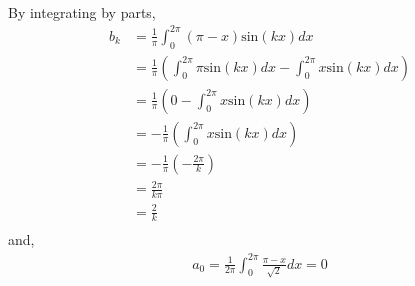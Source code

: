 \documentclass[letterpaper,12pt]{article}
\theoremstyle{definition}
\begin{document}
\\
By integrating by parts,
\begin{align*}
b_k &= \frac{1}{\pi} \int^{2\pi}_{0} (\pi - x) \text{sin}(kx) dx\\
&= \frac{1}{\pi} \left(  \int^{2\pi}_{0} \pi \text{sin}(kx) dx - \int^{2\pi}_{0} x \text{sin}(kx) dx\right)\\
&= \frac{1}{\pi} \left(  0 - \int^{2\pi}_{0} x \text{sin}(kx) dx\right)\\
&= -\frac{1}{\pi} \left(  \int^{2\pi}_{0} x \text{sin}(kx) dx\right)\\
&= - \frac{1}{\pi} \left(  -\frac{2\pi}{k}\right)\\
&=  \frac{2\pi}{k\pi} \\
&=  \frac{2}{k} \\
\end{align*}
and,
\begin{align*}
a_0 = \frac{1}{2\pi} \int^{2  \pi}_{0} \frac{\pi - x}{\sqrt 2} dx = 0
\end{align*}
\end{document}
